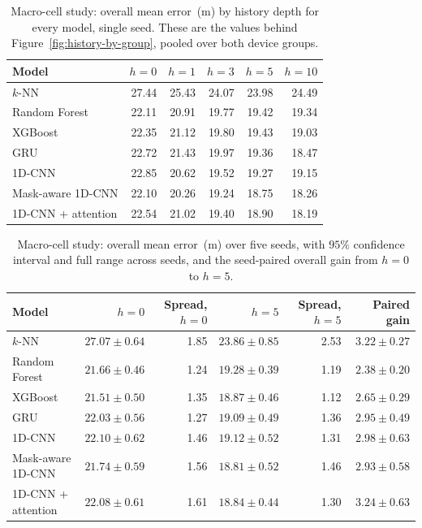 \begin{table}[h]
  \centering
  \caption{Macro-cell study: overall mean error~(m) by history depth for every model, single seed. These are the values behind Figure~\ref{fig:history-by-group}, pooled over both device groups.}
  \label{tab:supp-depth}
  \small
  \begin{tabular}{@{}lrrrrr@{}}
    \toprule
    Model & $h=0$ & $h=1$ & $h=3$ & $h=5$ & $h=10$ \\
    \midrule
    $k$-NN & 27.44 & 25.43 & 24.07 & 23.98 & 24.49 \\
    Random Forest & 22.11 & 20.91 & 19.77 & 19.42 & 19.34 \\
    XGBoost & 22.35 & 21.12 & 19.80 & 19.43 & 19.03 \\
    GRU & 22.72 & 21.43 & 19.97 & 19.36 & 18.47 \\
    1D-CNN & 22.85 & 20.62 & 19.52 & 19.27 & 19.15 \\
    Mask-aware 1D-CNN & 22.10 & 20.26 & 19.24 & 18.75 & 18.26 \\
    1D-CNN + attention & 22.54 & 21.02 & 19.40 & 18.90 & 18.19 \\
    \bottomrule
  \end{tabular}
\end{table}

\begin{table}[h]
  \centering
  \caption{Macro-cell study: overall mean error~(m) over five seeds, with $95\%$ confidence interval and full range across seeds, and the seed-paired overall gain from $h=0$ to $h=5$.}
  \label{tab:supp-seeds}
  \small
  \begin{tabular}{@{}lrrrrr@{}}
    \toprule
    Model & $h=0$ & Spread, $h=0$ & $h=5$ & Spread, $h=5$ & Paired gain \\
    \midrule
    $k$-NN & $27.07 \pm 0.64$ & 1.85 & $23.86 \pm 0.85$ & 2.53 & $3.22 \pm 0.27$ \\
    Random Forest & $21.66 \pm 0.46$ & 1.24 & $19.28 \pm 0.39$ & 1.19 & $2.38 \pm 0.20$ \\
    XGBoost & $21.51 \pm 0.50$ & 1.35 & $18.87 \pm 0.46$ & 1.12 & $2.65 \pm 0.29$ \\
    GRU & $22.03 \pm 0.56$ & 1.27 & $19.09 \pm 0.49$ & 1.36 & $2.95 \pm 0.49$ \\
    1D-CNN & $22.10 \pm 0.62$ & 1.46 & $19.12 \pm 0.52$ & 1.31 & $2.98 \pm 0.63$ \\
    Mask-aware 1D-CNN & $21.74 \pm 0.59$ & 1.56 & $18.81 \pm 0.52$ & 1.46 & $2.93 \pm 0.58$ \\
    1D-CNN + attention & $22.08 \pm 0.61$ & 1.61 & $18.84 \pm 0.44$ & 1.30 & $3.24 \pm 0.63$ \\
    \bottomrule
  \end{tabular}
\end{table}

